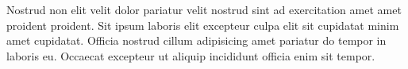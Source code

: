 Nostrud non elit velit dolor pariatur velit nostrud sint ad exercitation amet amet proident proident. Sit ipsum laboris elit excepteur culpa elit sit cupidatat minim amet cupidatat. Officia nostrud cillum adipisicing amet pariatur do tempor in laboris eu. Occaecat excepteur ut aliquip incididunt officia enim sit tempor.